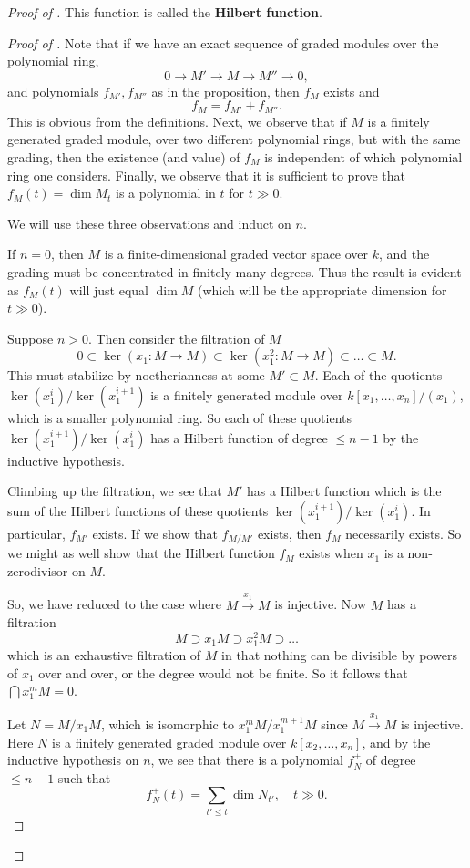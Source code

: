 \begin{proof}[Proof of  ]
This function is called the \textbf{Hilbert function}.

\begin{proof}[Proof of ]
Note that if we have an exact sequence of graded modules over the polynomial
ring,
\[ 0 \to M' \to M \to M'' \to 0,   \]
and polynomials $f_{M'}, f_{M''}$ as in the proposition, then $f_M$ exists and 
\[ f_M = f_{M'} + f_{M''}.  \] This is obvious from the definitions.
Next, we observe that if $M$ is a finitely generated graded module, over two
different polynomial rings, but with the same grading, then the existence (and
value) of $f_M$ is independent of which polynomial ring one considers.
Finally, we observe that it is sufficient to prove that $f_M(t) = \dim M_t$ is a
polynomial in $t$ for $t \gg 0$.

We will
use these three observations and induct on $n$.

If $n  = 0$, then $M$ is a finite-dimensional graded vector space over
$k$, and the grading must be concentrated in finitely many degrees. Thus
the result is evident as $f_{M}(t)$ will just equal $\dim M$ (which will be the
appropriate dimension for $t \gg 0$). 

Suppose $n > 0$.  Then
consider the filtration of $M$
\[ 0 \subset \ker( x_1: M \to M) \subset \ker (x_1^2: M \to M) \subset \dots
\subset M.  \]
This must stabilize by noetherianness at some $M' \subset M$. Each of the
quotients $\ker( x_1^i)/\ker (x_1^{i+1})$ is a finitely generated module over
$k[x_1, \dots,
x_n]/(x_1)$, which is a smaller polynomial ring.  So each of these quotients
$\ker (x_1^{i+1})/\ker (x_1^{i})$ has a Hilbert function of degree $\leq n-1$ by
the inductive hypothesis. 

Climbing up the filtration, we see that  $M'$ has a Hilbert function which is the sum of the Hilbert functions of
these quotients $\ker(x_1^{i+1})/\ker(x_1^{i})$. In particular, $f_{M'}$ exists. If we show that $f_{M/M'}$
exists, then $f_M$ necessarily exists. So we might as well show that the
Hilbert function $f_M$ exists when $x_1$ is  a non-zerodivisor on $M$. 

So, we have reduced to the case where $M \stackrel{x_1}{\to} M$
is injective.
Now $M$ has a filtration
\[ M \supset x_1 M \supset x_1^2 M \supset \dots  \]
which is an exhaustive filtration of $M$ in that nothing can be divisible by
powers of $x_1$ over and over, or the degree would not be finite. So it
follows that  $\bigcap x_1^m M = 0$. 

Let $N = M/x_1 M $, which is isomorphic to $ x_1^m M/x_1^{m+1} M$ since $M \stackrel{x_1}{\to} M$ is
injective. Here $N$ is a finitely generated graded module over $k[x_2, \dots, x_n]$, and by the
inductive hypothesis on $n$, we see that there is a polynomial $f_N^+$ of degree $\leq n-1$ such that
\[ f_N^+(t) = \sum_{t' \leq t} \dim N_{t'}, \quad t \gg 0.  \]


\end{proof}
\end{proof}
